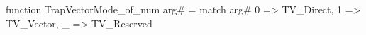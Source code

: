 function TrapVectorMode_of_num arg# = match arg# {
  0 => TV_Direct,
  1 => TV_Vector,
  _ => TV_Reserved
}
